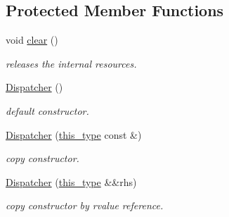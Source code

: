 \subsection*{Protected Member Functions}
\begin{DoxyCompactItemize}
\item 
\hypertarget{classhryky_1_1reduction_1_1_dispatcher_a213555cff0e556163c353f138156891b}{void \hyperlink{classhryky_1_1reduction_1_1_dispatcher_a213555cff0e556163c353f138156891b}{clear} ()}\label{classhryky_1_1reduction_1_1_dispatcher_a213555cff0e556163c353f138156891b}

\begin{DoxyCompactList}\small\item\em releases the internal resources. \end{DoxyCompactList}\item 
\hypertarget{classhryky_1_1reduction_1_1_dispatcher_a700388b49ff9e305c873d5f070e38951}{\hyperlink{classhryky_1_1reduction_1_1_dispatcher_a700388b49ff9e305c873d5f070e38951}{Dispatcher} ()}\label{classhryky_1_1reduction_1_1_dispatcher_a700388b49ff9e305c873d5f070e38951}

\begin{DoxyCompactList}\small\item\em default constructor. \end{DoxyCompactList}\item 
\hypertarget{classhryky_1_1reduction_1_1_dispatcher_a84ee14aff2023c08285449fcf613cd30}{\hyperlink{classhryky_1_1reduction_1_1_dispatcher_a84ee14aff2023c08285449fcf613cd30}{Dispatcher} (\hyperlink{classhryky_1_1reduction_1_1_dispatcher_a8a3ef8b3aa55fc7139de687a9be4f693}{this\-\_\-type} const \&)}\label{classhryky_1_1reduction_1_1_dispatcher_a84ee14aff2023c08285449fcf613cd30}

\begin{DoxyCompactList}\small\item\em copy constructor. \end{DoxyCompactList}\item 
\hypertarget{classhryky_1_1reduction_1_1_dispatcher_af062fd5d3c79d281f4cff741128210af}{\hyperlink{classhryky_1_1reduction_1_1_dispatcher_af062fd5d3c79d281f4cff741128210af}{Dispatcher} (\hyperlink{classhryky_1_1reduction_1_1_dispatcher_a8a3ef8b3aa55fc7139de687a9be4f693}{this\-\_\-type} \&\&rhs)}\label{classhryky_1_1reduction_1_1_dispatcher_af062fd5d3c79d281f4cff741128210af}

\begin{DoxyCompactList}\small\item\em copy constructor by rvalue reference. \end{DoxyCompactList}\end{DoxyCompactItemize}
